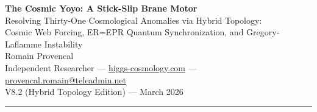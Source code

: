 \documentclass[11pt]{article}
\begin{document}
\begin{center}
{\LARGE\bfseries The Cosmic Yoyo: A Stick-Slip Brane Motor}\\[6pt]
{\large Resolving Thirty-One Cosmological Anomalies via Hybrid Topology:\\Cosmic Web Forcing, ER=EPR Quantum Synchronization, and Gregory-Laflamme Instability}\\[12pt]
{\large Romain Provencal}\\[2pt]
{\small Independent Researcher --- \href{https://higgs-cosmology.com}{higgs-cosmology.com} --- \href{mailto:provencal.romain@teleadmin.net}{provencal.romain@teleadmin.net}}\\[2pt]
{\small V8.2 (Hybrid Topology Edition) --- March 2026}
\end{center}

\vspace{8pt}
\hrule
\vspace{8pt}
\end{document}
